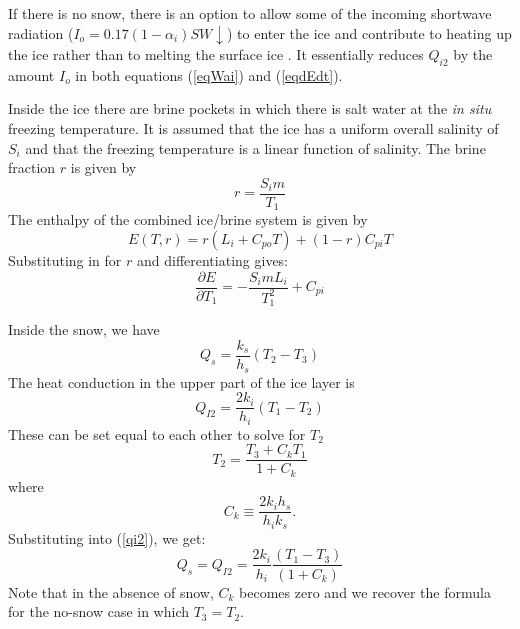 If there is no snow, there is an option to allow some of the incoming
shortwave radiation ($I_o = 0.17(1-\alpha_i)SW\!\!\downarrow$) to
enter the ice and contribute to heating up the ice rather than to
melting the surface ice \citep{Maykut71}. It essentially reduces $Q_{i2}$
by the amount $I_o$ in both equations (\ref{eqWai}) and (\ref{eqdEdt}).


Inside the ice there are brine pockets in which there is salt water
at the {\it in situ} freezing temperature. It is assumed that the ice
has a uniform overall salinity of $S_i$ and that the freezing
temperature is a linear function of salinity. The brine fraction $r$ is
given by
$$
  r = \frac{S_i m }{ T_1}
$$
The enthalpy of the combined ice/brine system is given by
\begin{equation}
  E(T,r) = r(L_i + C_{po}T) + (1-r) C_{pi} T
\end{equation}
Substituting in for $r$ and differentiating gives:
\begin{equation}
  \frac{\partial E }{ \partial T_1} = - \frac{S_i m L_i }{ T_1^2} + C_{pi}
\end{equation}

Inside the snow, we have
\begin{equation}
   Q_s = \frac{k_s }{ h_s} (T_2 - T_3)
\end{equation}
The heat conduction in the upper part of the ice layer is
\begin{equation}
   Q_{I2} = \frac{ 2 k_i }{ h_i} (T_1 - T_2)
   \label{qi2}
\end{equation}
These can be set equal to each other to solve for $T_2$
\begin{equation}
   T_2 = \frac{T_3 + C_k T_1 }{ 1 + C_k}
\end{equation}
where
$$
  C_k \equiv \frac{2 k_i h_s }{ h_i k_s}.
$$
Substituting into (\ref{qi2}), we get:
\begin{equation}
  Q_s = Q_{I2} = \frac{2k_i }{ h_i} \frac{(T_1 - T_3) }{ (1 + C_k)}
\label{qsnow}
\end{equation}
Note that in the absence of snow, $C_k$ becomes zero and we recover the
formula for the no-snow case in which $T_3 = T_2$.

